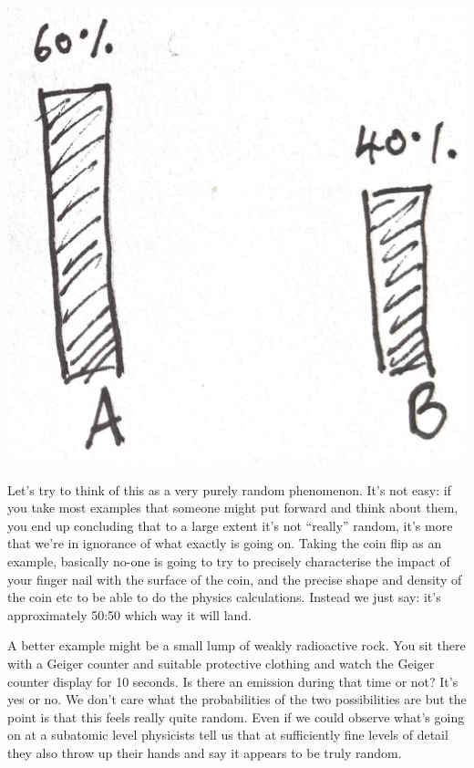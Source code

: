 \includegraphics[width=400pt]{img/statistics-and-machine-learning--introduction--overview--random-variables-8b8d.png}



Let's try to think of this as a very purely random phenomenon. It's not easy: if you take most examples that
someone might put forward and think about them, you end up concluding that to a large extent it's not ``really​''
random, it's more that we're in ignorance of what exactly is going on. Taking the coin flip as an example,
basically no-one is going to try to precisely characterise the impact of your finger nail with the surface of
the coin, and the precise shape and density of the coin etc to be able to do the physics calculations. Instead
we just say: it's approximately 50:50 which way it will land.

A better example might be a small lump of weakly radioactive rock. You sit there with a Geiger counter and
suitable protective clothing and watch the Geiger counter display for 10 seconds. Is there an emission during
that time or not? It's yes or no. We don't care what the probabilities of the two possibilities are but the
point is that this feels really quite random. Even if we could observe what's going on at a subatomic level
physicists tell us that at sufficiently fine levels of detail they also throw up their hands and say it appears
to be truly random.






